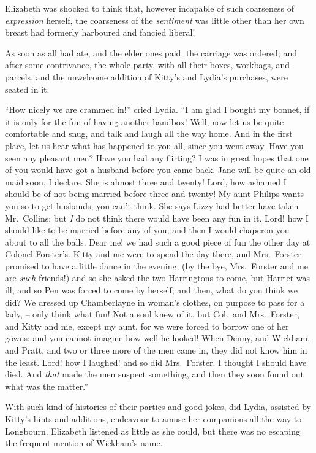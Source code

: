 Elizabeth was shocked to think that, however incapable
of such coarseness of \textit{expression} herself, the coarseness
of the \textit{sentiment} was little other than her own breast had
formerly harboured and fancied liberal!

As soon as all had ate, and the elder ones paid, the
carriage was ordered; and after some contrivance, the
whole party, with all their boxes, workbags, and parcels,
and the unwelcome addition of Kitty’s and Lydia’s
purchases, were seated in it.

“How nicely we are crammed in!” cried Lydia. “I am
glad I bought my bonnet, if it is only for the fun of having
another bandbox! Well, now let us be quite comfortable
and snug, and talk and laugh all the way home. And
in the first place, let us hear what has happened to you
all, since you went away. Have you seen any pleasant
men? Have you had any flirting? I was in great hopes
that one of you would have got a husband before you came
back. Jane will be quite an old maid soon, I declare.
She is almost three and twenty! Lord, how ashamed
I should be of not being married before three and twenty!
My aunt Philips wants you so to get husbands, you can’t
think. She says Lizzy had better have taken Mr.\ Collins;
but \textit{I} do not think there would have been any fun in it.
Lord! how I should like to be married before any of you;
and then I would chaperon you about to all the balls.
Dear me! we had such a good piece of fun the other day
at Colonel Forster’s. Kitty and me were to spend the
day there, and Mrs.\ Forster promised to have a little
dance in the evening; (by the bye, Mrs.\ Forster and
me are \textit{such} friends!) and so she asked the two Harringtons
to come, but Harriet was ill, and so Pen was forced to
come by herself; and then, what do you think we did?
We dressed up Chamberlayne in woman’s clothes, on
purpose to pass for a lady, -- only think what fun! Not
a soul knew of it, but Col.\ and Mrs.\ Forster, and
Kitty and me, except my aunt, for we were forced to
borrow one of her gowns; and you cannot imagine how
well he looked! When Denny, and Wickham, and Pratt,
and two or three more of the men came in, they did not
know him in the least. Lord! how I laughed! and so
did Mrs.\ Forster. I thought I should have died. And
\textit{that} made the men suspect something, and then they soon
found out what was the matter.”

With such kind of histories of their parties and good
jokes, did Lydia, assisted by Kitty’s hints and additions,
endeavour to amuse her companions all the way to Longbourn.
Elizabeth listened as little as she could, but there
was no escaping the frequent mention of Wickham’s
name.

